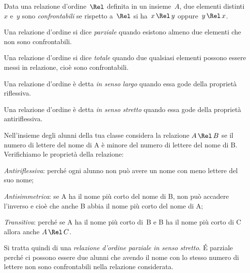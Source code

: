 \begin{definizione}
Data una relazione d'ordine~$\Rel$ definita in un insieme~$A$, due elementi distinti~$x$ e~$y$ sono \emph{confrontabili} se rispetto a~$\Rel$ si ha~$x \,\Rel\, y$ oppure~$y \,\Rel\, x$.
\end{definizione}

\begin{definizione}
Una relazione d'ordine si dice \emph{parziale} quando esistono almeno due elementi che non sono confrontabili.
\end{definizione}

\begin{definizione}
Una relazione d'ordine si dice \emph{totale} quando due qualsiasi elementi possono essere messi in relazione, cioè sono confrontabili.
\end{definizione}

\begin{definizione}
Una relazione d'ordine è detta \emph{in senso largo} quando essa gode della proprietà riflessiva.
\end{definizione}

\begin{definizione}
Una relazione d'ordine è detta \emph{in senso stretto} quando essa gode della proprietà antiriflessiva.
\end{definizione}

\begin{center}
 
\end{center}

\begin{exrig}
 \begin{esempio}
Nell'insieme degli alunni della tua classe considera la relazione $A \, \Rel \, B$ se il numero di lettere del nome di A è minore del numero di lettere del nome di B.
Verifichiamo le proprietà della relazione:
\begin{enumerate*}
\item \emph{Antiriflessiva}: perché ogni alunno non può avere un nome con meno lettere del suo nome;
\item \emph{Antisimmetrica}: se A ha il nome più corto del nome di B, non può accadere l'inverso e cioè che anche B abbia il nome più corto del nome di A;
\item \emph{Transitiva}: perché se A ha il nome più corto di~B e B ha il nome più corto di C allora anche $A \, \Rel \, C$.
\end{enumerate*}
Si tratta quindi di una \emph{relazione d'ordine parziale in senso stretto}. É parziale perché ci possono essere due alunni che avendo il nome con lo stesso numero di lettere non sono confrontabili nella relazione considerata.
 \end{esempio}
\end{exrig}

